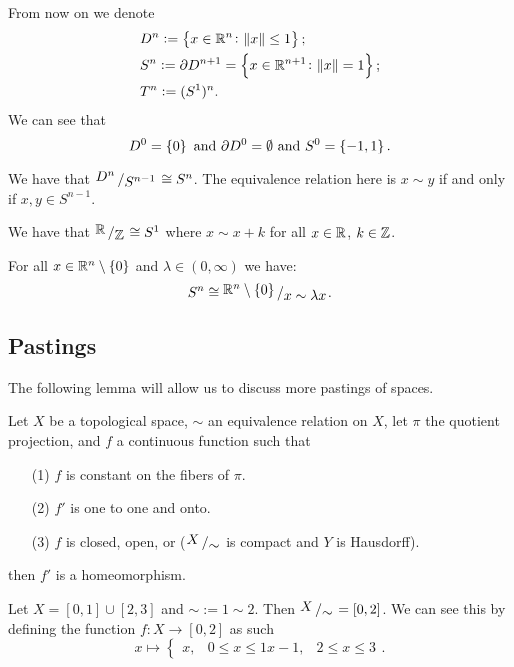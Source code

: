\documentclass[11pt,a4paper]{article}
\begin{document}
From now on we denote
\begin{align*}
  &D^n := \set{x \in \mathbb{R}^n \colon \norm{x} \le 1}; \\
  &S^n := \partial D^{n+1} = \set{x \in \mathbb{R}^{n+1} \colon \norm{x} = 1}; \\
  &T^n := (S^1)^n.
\end{align*}
We can see that
\[
  D^0 = \set{0} \text{ and } \partial D^0 = \emptyset \text{ and } S^0 = \set{-1, 1}.
\]

\begin{example}
  We have that $\bigslant{D^n}{S^{n-1}} \cong S^n$.
  The equivalence relation here is $x \sim y$ if and only if $x,y \in S^{n-1}$.
\end{example}
\begin{example}
  We have that $\bigslant{\R}{\Z} \cong S^1$ where $x \sim x + k$ for all
  $x \in \mathbb{R}$, $k \in \mathbb{Z}$.
\end{example}
\begin{example}
  For all $x \in \mathbb{R}^n \setminus \set{0}$ and $\lambda \in (0,\infty)$ we
  have:
  \[
    S^n \cong \bigslant{\R^n \setminus \set{0}}{x \sim \lambda x}.
  \]
\end{example}

\subsection{Pastings}

The following lemma will allow us to discuss more pastings of spaces.

\begin{lemma}
  Let $X$ be a topological space, $\sim$ an equivalence relation on $X$,
  let $\pi$ the quotient projection, and $f$ a continuous function such that
  \begin{enumerate}
    \item[(1)] $f$ is constant on the fibers of $\pi$.
    \item[(2)] $f'$ is one to one and onto.
    \item[(3)] $f$ is closed, open, or ($\bigslant{X}{\sim}$ is compact and
      $Y$ is Hausdorff).
  \end{enumerate}
  then $f'$ is a homeomorphism.
\end{lemma}

\begin{example}
  Let $X = [0,1] \cup [2,3]$ and $\sim := 1 \sim 2$.
  Then $\bigslant{X}{\sim} = [0,2]$.
  We can see this by defining the function $f \colon X \to [0,2]$ as such
  \[
    x \mapsto
    \begin{cases}
      x, & 0 \le x \le 1
      x - 1, & 2 \le x \le 3
    \end{cases}.
  \]
\end{example}
\end{document}
